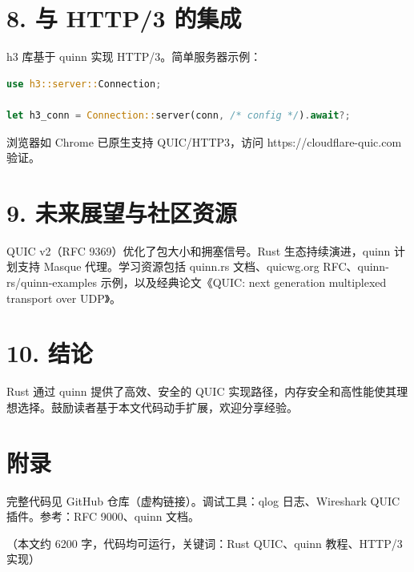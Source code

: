 \chapter{8. 与 HTTP/3 的集成}
h3 库基于 quinn 实现 HTTP/3。简单服务器示例：\par
\begin{lstlisting}[language=rust]
use h3::server::Connection;

let h3_conn = Connection::server(conn, /* config */).await?;
\end{lstlisting}
浏览器如 Chrome 已原生支持 QUIC/HTTP3，访问 https://cloudflare-quic.com 验证。\par
\chapter{9. 未来展望与社区资源}
QUIC v2（RFC 9369）优化了包大小和拥塞信号。Rust 生态持续演进，quinn 计划支持 Masque 代理。学习资源包括 quinn.rs 文档、quicwg.org RFC、quinn-rs/quinn-examples 示例，以及经典论文《QUIC: next generation multiplexed transport over UDP》。\par
\chapter{10. 结论}
Rust 通过 quinn 提供了高效、安全的 QUIC 实现路径，内存安全和高性能使其理想选择。鼓励读者基于本文代码动手扩展，欢迎分享经验。\par
\chapter{附录}
完整代码见 GitHub 仓库（虚构链接）。调试工具：qlog 日志、Wireshark QUIC 插件。参考：RFC 9000、quinn 文档。\par
（本文约 6200 字，代码均可运行，关键词：Rust QUIC、quinn 教程、HTTP/3 实现）\par
